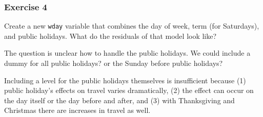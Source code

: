 \documentclass[]{book}
\newenvironment{Shaded}{\begin{snugshade}}{\end{snugshade}}
\newcommand{\CommentTok}[1]{\textcolor[rgb]{0.56,0.35,0.01}{\textit{#1}}}
\newcommand{\KeywordTok}[1]{\textcolor[rgb]{0.13,0.29,0.53}{\textbf{#1}}}
\newcommand{\NormalTok}[1]{#1}
\newcommand{\OperatorTok}[1]{\textcolor[rgb]{0.81,0.36,0.00}{\textbf{#1}}}
\newcommand{\StringTok}[1]{\textcolor[rgb]{0.31,0.60,0.02}{#1}}
\theoremstyle{definition}
\theoremstyle{definition}
\theoremstyle{definition}
\theoremstyle{remark}
\begin{document}
\begin{Shaded}
\end{Shaded}

\hypertarget{exercise-4-36}{%
\subsubsection{Exercise 4}\label{exercise-4-36}}

Create a new \texttt{wday} variable that combines the day of week, term
(for Saturdays), and public holidays. What do the residuals of that
model look like?

The question is unclear how to handle the public holidays. We could
include a dummy for all public holidays? or the Sunday before public
holidays?

Including a level for the public holidays themselves is insufficient
because (1) public holiday's effects on travel varies dramatically, (2)
the effect can occur on the day itself or the day before and after, and
(3) with Thanksgiving and Christmas there are increases in travel as
well.
\end{document}
